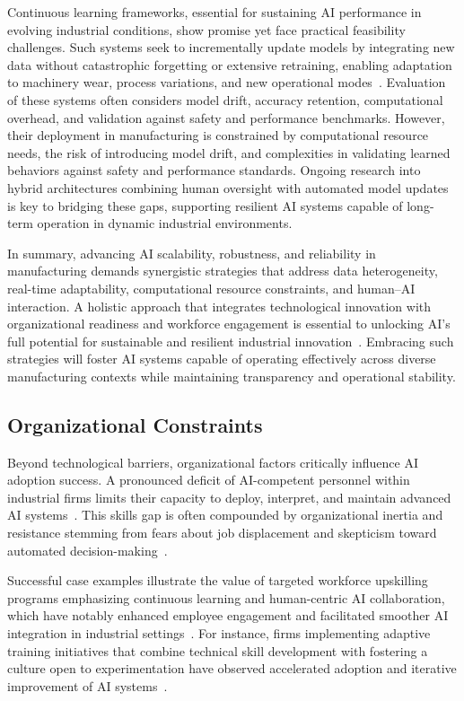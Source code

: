 \documentclass[sigconf]{acmart}
\begin{document}
Continuous learning frameworks, essential for sustaining AI performance in evolving industrial conditions, show promise yet face practical feasibility challenges. Such systems seek to incrementally update models by integrating new data without catastrophic forgetting or extensive retraining, enabling adaptation to machinery wear, process variations, and new operational modes~\cite{ref31,ref32}. Evaluation of these systems often considers model drift, accuracy retention, computational overhead, and validation against safety and performance benchmarks. However, their deployment in manufacturing is constrained by computational resource needs, the risk of introducing model drift, and complexities in validating learned behaviors against safety and performance standards. Ongoing research into hybrid architectures combining human oversight with automated model updates is key to bridging these gaps, supporting resilient AI systems capable of long-term operation in dynamic industrial environments.

In summary, advancing AI scalability, robustness, and reliability in manufacturing demands synergistic strategies that address data heterogeneity, real-time adaptability, computational resource constraints, and human–AI interaction. A holistic approach that integrates technological innovation with organizational readiness and workforce engagement is essential to unlocking AI's full potential for sustainable and resilient industrial innovation~\cite{ref6,ref19}. Embracing such strategies will foster AI systems capable of operating effectively across diverse manufacturing contexts while maintaining transparency and operational stability.

\subsection{Organizational Constraints}

Beyond technological barriers, organizational factors critically influence AI adoption success. A pronounced deficit of AI-competent personnel within industrial firms limits their capacity to deploy, interpret, and maintain advanced AI systems~\cite{ref7,ref26}. This skills gap is often compounded by organizational inertia and resistance stemming from fears about job displacement and skepticism toward automated decision-making~\cite{ref3,ref26}.

Successful case examples illustrate the value of targeted workforce upskilling programs emphasizing continuous learning and human-centric AI collaboration, which have notably enhanced employee engagement and facilitated smoother AI integration in industrial settings~\cite{ref3,ref38}. For instance, firms implementing adaptive training initiatives that combine technical skill development with fostering a culture open to experimentation have observed accelerated adoption and iterative improvement of AI systems~\cite{ref26,ref38}.
\end{document}
